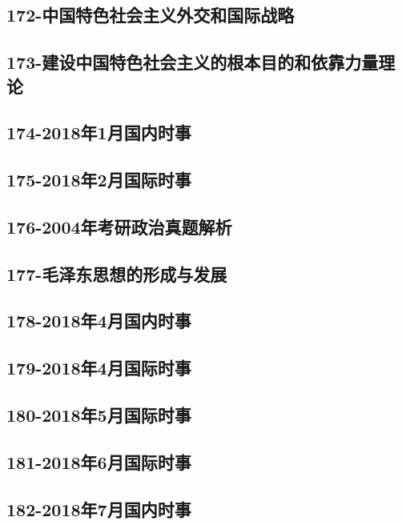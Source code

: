 \subsection{172-中国特色社会主义外交和国际战略}

\subsection{173-建设中国特色社会主义的根本目的和依靠力量理论}

\subsection{174-2018年1月国内时事}

\subsection{175-2018年2月国际时事}

\subsection{176-2004年考研政治真题解析}

\subsection{177-毛泽东思想的形成与发展}

\subsection{178-2018年4月国内时事}

\subsection{179-2018年4月国际时事}

\subsection{180-2018年5月国际时事}

\subsection{181-2018年6月国际时事}

\subsection{182-2018年7月国内时事}

